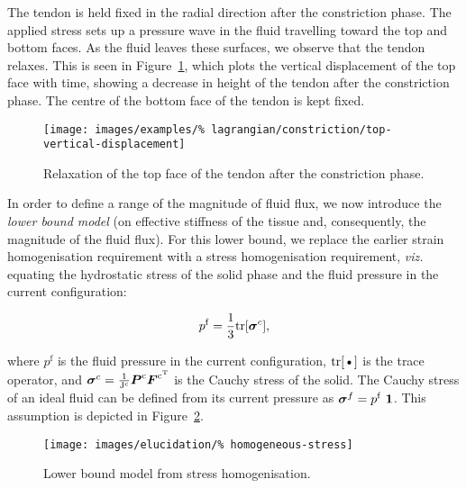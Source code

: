 
The tendon is held fixed in the radial direction after the
constriction phase. The applied stress sets up a pressure wave in the
fluid travelling toward the top and bottom faces. As the fluid leaves
these surfaces, we observe that the tendon relaxes. This is seen in
Figure~\ref{topdisp}, which plots the vertical displacement of the top
face with time, showing a decrease in height of the tendon after the
constriction phase. The centre of the bottom face of the tendon is
kept fixed.

\begin{figure}[!hpt]
  \centering
  \texttt{[image: images/examples/\%
    lagrangian/constriction/top-vertical-displacement]}
  \caption{Relaxation of the top face of the tendon after the
    constriction phase.}
  \label{topdisp}
\end{figure}

In order to define a range of the magnitude of fluid flux, we now
introduce the {\em lower bound model} (on effective stiffness of the
tissue and, consequently, the magnitude of the fluid flux). For this
lower bound, we replace the earlier strain homogenisation requirement
with a stress homogenisation requirement, {\em viz.} equating the
hydrostatic stress of the solid phase and the fluid pressure in the
current configuration:

\begin{equation}
p^{\mathrm{f}} = \frac{1}{3} \mathrm{tr}[\mbox{\boldmath$\sigma$}^{c}],
\label{equalpr}
\end{equation}

\noindent where $p^{\mathrm{f}}$ is the fluid pressure in the current
configuration, $\mbox{tr[\textbullet]}$ is the trace operator,
and $\mbox{\boldmath$\sigma$}^{c}=\frac{1}{\mathrm{J^{c}}} \mbox{\boldmath$ P$}^{\mathrm{c}}
\mbox{\boldmath$ F$}^{\mathrm{c}^{\mathrm{T}}}$ is the Cauchy stress of the solid. The
Cauchy stress of an ideal fluid can be defined from its current
pressure as \mbox{$\Bsigma^{f}= p^{\mathrm{f}}\ \bone$.} This
assumption is depicted in Figure~\ref{lower-bound-model}.

\begin{figure}[ht]
  \centering
  \texttt{[image: images/elucidation/\%
    homogeneous-stress]}
  \caption{Lower bound model from stress homogenisation.}
  \label{lower-bound-model}
\end{figure}

